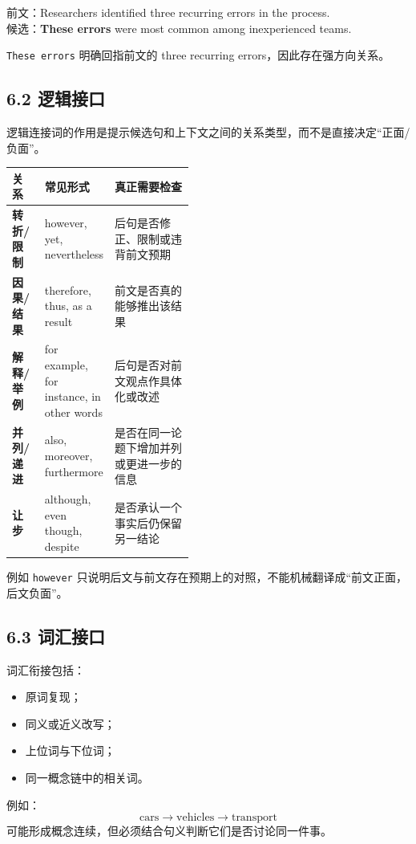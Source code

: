 \documentclass[11pt,a4paper]{ctexart}
\begin{document}
\begin{eng}[例 3：指示词提供强方向]
前文：Researchers identified three recurring errors in the process.\\
候选：\textbf{These errors} were most common among inexperienced teams.
\end{eng}
\texttt{These errors} 明确回指前文的 three recurring errors，因此存在强方向关系。

\subsection{6.2 逻辑接口}
逻辑连接词的作用是提示候选句和上下文之间的关系类型，而不是直接决定“正面/负面”。

\begin{center}
\small
\begin{tabularx}{\linewidth}{>{\bfseries}p{0.18\linewidth} p{0.27\linewidth} X}
\toprule
关系 & 常见形式 & 真正需要检查 \\
\midrule
转折/限制 & however, yet, nevertheless & 后句是否修正、限制或违背前文预期 \\
因果/结果 & therefore, thus, as a result & 前文是否真的能够推出该结果 \\
解释/举例 & for example, for instance, in other words & 后句是否对前文观点作具体化或改述 \\
并列/递进 & also, moreover, furthermore & 是否在同一论题下增加并列或更进一步的信息 \\
让步 & although, even though, despite & 是否承认一个事实后仍保留另一结论 \\
\bottomrule
\end{tabularx}
\end{center}

例如 \texttt{however} 只说明后文与前文存在预期上的对照，不能机械翻译成“前文正面，后文负面”。

\subsection{6.3 词汇接口}
词汇衔接包括：
\begin{itemize}
  \item 原词复现；
  \item 同义或近义改写；
  \item 上位词与下位词；
  \item 同一概念链中的相关词。
\end{itemize}

例如：
\[
\text{cars}
\rightarrow
\text{vehicles}
\rightarrow
\text{transport}
\]
可能形成概念连续，但必须结合句义判断它们是否讨论同一件事。
\end{document}
